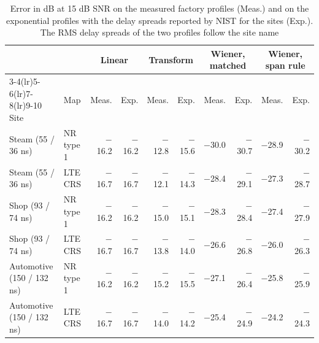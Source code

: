 \begin{table}[t]
\caption{Error in dB at 15 dB SNR on the measured factory profiles (Meas.) and on the exponential profiles with the delay spreads reported by NIST for the sites (Exp.). The RMS delay spreads of the two profiles follow the site name}
\label{tab:measured}
\centering
\footnotesize
\setlength{\tabcolsep}{3.5pt}
\begin{tabular}{ll rr rr rr rr}
\toprule
 & & \multicolumn{2}{c}{Linear} & \multicolumn{2}{c}{Transform} & \multicolumn{2}{c}{Wiener, matched} & \multicolumn{2}{c}{Wiener, span rule} \\
\cmidrule(lr){3-4}\cmidrule(lr){5-6}\cmidrule(lr){7-8}\cmidrule(lr){9-10}
Site & Map & Meas. & Exp. & Meas. & Exp. & Meas. & Exp. & Meas. & Exp. \\
\midrule
Steam (55 / 36 ns) & NR type 1 & $-$16.2 & $-$16.2 & $-$12.8 & $-$15.6 & $-$30.0 & $-$30.7 & $-$28.9 & $-$30.2 \\
Steam (55 / 36 ns) & LTE CRS & $-$16.7 & $-$16.7 & $-$12.1 & $-$14.3 & $-$28.4 & $-$29.1 & $-$27.3 & $-$28.7 \\
Shop (93 / 74 ns) & NR type 1 & $-$16.2 & $-$16.2 & $-$15.0 & $-$15.1 & $-$28.3 & $-$28.4 & $-$27.4 & $-$27.9 \\
Shop (93 / 74 ns) & LTE CRS & $-$16.7 & $-$16.7 & $-$13.8 & $-$14.0 & $-$26.6 & $-$26.8 & $-$26.0 & $-$26.3 \\
Automotive (150 / 132 ns) & NR type 1 & $-$16.2 & $-$16.2 & $-$15.2 & $-$15.5 & $-$27.1 & $-$26.4 & $-$25.8 & $-$25.9 \\
Automotive (150 / 132 ns) & LTE CRS & $-$16.7 & $-$16.7 & $-$14.0 & $-$14.2 & $-$25.4 & $-$24.9 & $-$24.2 & $-$24.3 \\
\bottomrule
\end{tabular}
\end{table}
